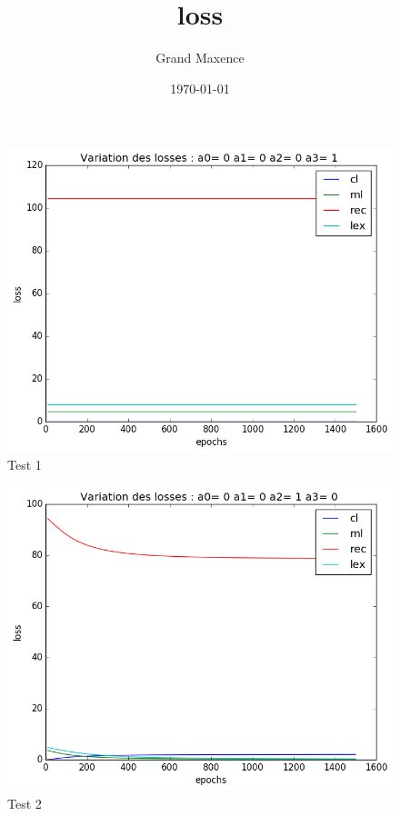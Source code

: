 \documentclass{article}
\title{loss}
\author{Grand Maxence}
\date{\today}
\begin{document}
\maketitle
\begin{figure}[!h]
  \centering
  \includegraphics[scale=0.8]{img/loss/test1.png}
  \caption{Test 1}
\end{figure}
\begin{figure}[!h]
  \centering
  \includegraphics[scale=0.8]{img/loss/test2.png}
  \caption{Test 2}
\end{figure}
\end{document}
